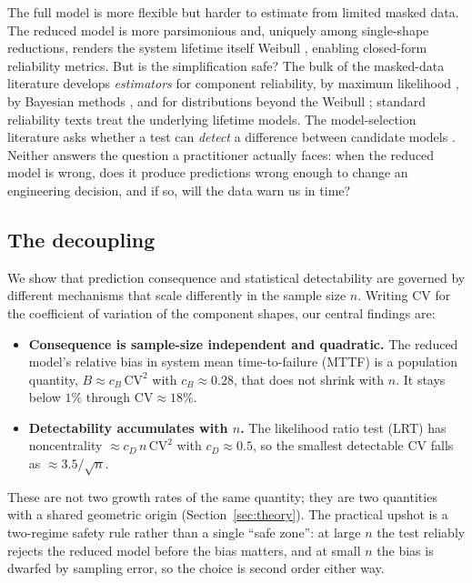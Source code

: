 \documentclass[11pt]{article}
\newcommand{\CV}{\mathrm{CV}}
\begin{document}
The full model is more flexible but harder to estimate from limited masked data. The reduced model is more parsimonious and, uniquely among single-shape reductions, renders the system lifetime itself Weibull \citep{barlow1975}, enabling closed-form reliability metrics. But is the simplification safe? The bulk of the masked-data literature develops \emph{estimators} for component reliability, by maximum likelihood \citep{Usher-1988, Lin-1993, Joh-1989, Usher-1996}, by Bayesian methods \citep{Lin-1996}, and for distributions beyond the Weibull \citep{Amma-2001, Amma-2004, Zhibi-2005, Zhibi-2007}; standard reliability texts \citep{lawless2003, meeker1998} treat the underlying lifetime models. The model-selection literature asks whether a test can \emph{detect} a difference between candidate models \citep{Craiu-2005, mccool1975}. Neither answers the question a practitioner actually faces: when the reduced model is wrong, does it produce predictions wrong enough to change an engineering decision, and if so, will the data warn us in time?

\subsection{The decoupling}

We show that prediction consequence and statistical detectability are governed by different mechanisms that scale differently in the sample size $n$. Writing $\CV$ for the coefficient of variation of the component shapes, our central findings are:
\begin{itemize}
\item \textbf{Consequence is sample-size independent and quadratic.} The reduced model's relative bias in system mean time-to-failure (MTTF) is a population quantity, $B \approx c_B\,\CV^2$ with $c_B \approx 0.28$, that does not shrink with $n$. It stays below $1\%$ through $\CV \approx 18\%$.
\item \textbf{Detectability accumulates with $n$.} The likelihood ratio test (LRT) has noncentrality $\approx c_D\,n\,\CV^2$ with $c_D \approx 0.5$, so the smallest detectable $\CV$ falls as $\approx 3.5/\sqrt{n}$.
\end{itemize}
These are not two growth rates of the same quantity; they are two quantities with a shared geometric origin (Section~\ref{sec:theory}). The practical upshot is a two-regime safety rule rather than a single ``safe zone'': at large $n$ the test reliably rejects the reduced model before the bias matters, and at small $n$ the bias is dwarfed by sampling error, so the choice is second order either way.
\end{document}
